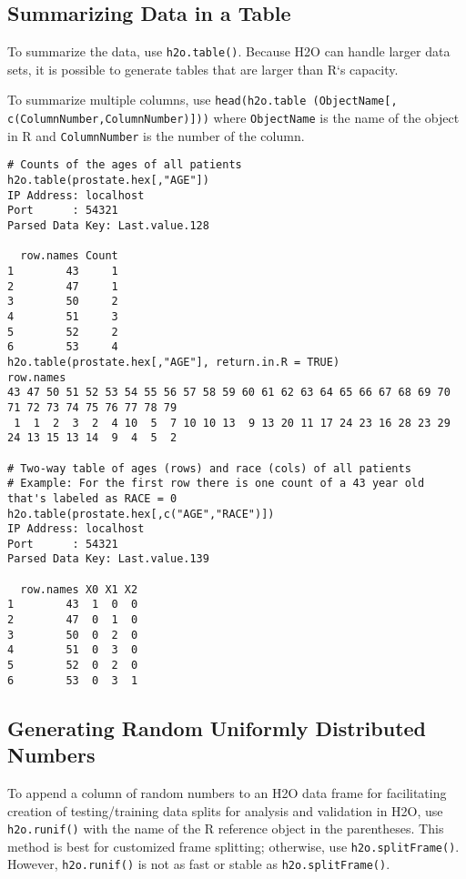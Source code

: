 \subsection{Summarizing Data in a Table}

To summarize the data, use {\texttt{h2o.table()}}. Because H2O can handle larger data sets, it is possible to generate tables that are larger than R`s capacity. 

To summarize multiple columns, use {\texttt{head(h2o.table (ObjectName[, c(ColumnNumber,ColumnNumber)]))}} where {\texttt{ObjectName}} is the name of the object in R and {\texttt{ColumnNumber}} is the number of the column. 

\begin{lstlisting}[breaklines,basicstyle=\ttfamily]
# Counts of the ages of all patients
h2o.table(prostate.hex[,"AGE"])
IP Address: localhost 
Port      : 54321 
Parsed Data Key: Last.value.128 

  row.names Count
1        43     1
2        47     1
3        50     2
4        51     3
5        52     2
6        53     4
h2o.table(prostate.hex[,"AGE"], return.in.R = TRUE)
row.names
43 47 50 51 52 53 54 55 56 57 58 59 60 61 62 63 64 65 66 67 68 69 70 71 72 73 74 75 76 77 78 79 
 1  1  2  3  2  4 10  5  7 10 10 13  9 13 20 11 17 24 23 16 28 23 29 24 13 15 13 14  9  4  5  2 

# Two-way table of ages (rows) and race (cols) of all patients
# Example: For the first row there is one count of a 43 year old that's labeled as RACE = 0
h2o.table(prostate.hex[,c("AGE","RACE")])
IP Address: localhost 
Port      : 54321 
Parsed Data Key: Last.value.139 

  row.names X0 X1 X2
1        43  1  0  0
2        47  0  1  0
3        50  0  2  0
4        51  0  3  0
5        52  0  2  0
6        53  0  3  1
\end{lstlisting}


\subsection{Generating Random Uniformly Distributed Numbers}

To append a column of random numbers to an H2O data frame for facilitating creation of testing/training data splits for analysis and validation in H2O, use {\texttt{h2o.runif()}} with the name of the R reference object in the parentheses. This method is best for customized frame splitting; otherwise, use {\texttt{h2o.splitFrame()}}. However, {\texttt{h2o.runif()}} is not as fast or stable as {\texttt{h2o.splitFrame()}}. 

